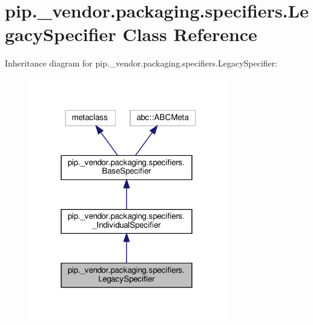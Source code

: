 \hypertarget{classpip_1_1__vendor_1_1packaging_1_1specifiers_1_1LegacySpecifier}{}\section{pip.\+\_\+vendor.\+packaging.\+specifiers.\+Legacy\+Specifier Class Reference}
\label{classpip_1_1__vendor_1_1packaging_1_1specifiers_1_1LegacySpecifier}


Inheritance diagram for pip.\+\_\+vendor.\+packaging.\+specifiers.\+Legacy\+Specifier\+:
\nopagebreak
\begin{figure}[H]
\begin{center}
\leavevmode
\includegraphics[width=247pt]{classpip_1_1__vendor_1_1packaging_1_1specifiers_1_1LegacySpecifier__inherit__graph}
\end{center}
\end{figure}


